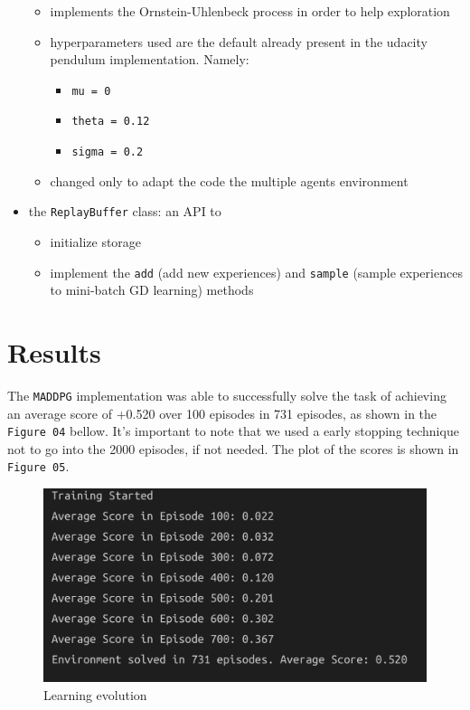 \documentclass[
]{article}
\providecommand{\tightlist}{%
  \setlength{\itemsep}{0pt}\setlength{\parskip}{0pt}}
\begin{document}
\begin{itemize}
  \begin{itemize}
  \tightlist
  \item
    implements the Ornstein-Uhlenbeck process in order to help
    exploration
  \item
    hyperparameters used are the default already present in the udacity
    pendulum implementation. Namely:

    \begin{itemize}
    \tightlist
    \item
      \texttt{mu\ =\ 0}
    \item
      \texttt{theta\ =\ 0.12}
    \item
      \texttt{sigma\ =\ 0.2}
    \end{itemize}
  \item
    changed only to adapt the code the multiple agents environment
  \end{itemize}
\item
  the \texttt{ReplayBuffer} class: an API to

  \begin{itemize}
  \tightlist
  \item
    initialize storage
  \item
    implement the \texttt{add} (add new experiences) and \texttt{sample}
    (sample experiences to mini-batch GD learning) methods
  \end{itemize}
\end{itemize}

\pagebreak

\hypertarget{results}{%
\section{Results}\label{results}}

The \texttt{MADDPG} implementation was able to successfully solve the
task of achieving an average score of +0.520 over 100 episodes in 731
episodes, as shown in the \texttt{Figure\ 04} bellow. It's important to
note that we used a early stopping technique not to go into the 2000
episodes, if not needed. The plot of the scores is shown in
\texttt{Figure\ 05}.

\begin{figure}
\centering
\includegraphics{imgs/results_1.png}
\caption{Learning evolution}
\end{figure}
\end{document}
